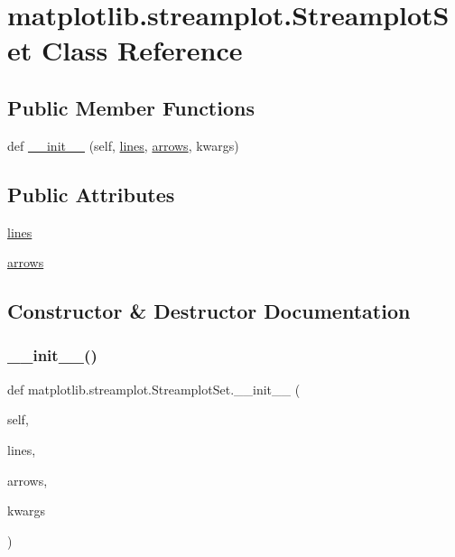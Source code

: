 \hypertarget{classmatplotlib_1_1streamplot_1_1StreamplotSet}{}\section{matplotlib.\+streamplot.\+Streamplot\+Set Class Reference}
\label{classmatplotlib_1_1streamplot_1_1StreamplotSet}
\subsection*{Public Member Functions}
\begin{DoxyCompactItemize}
\item 
def \hyperlink{classmatplotlib_1_1streamplot_1_1StreamplotSet_a49468bf62ed7cc5ff95fdd45304f1c7e}{\+\_\+\+\_\+init\+\_\+\+\_\+} (self, \hyperlink{classmatplotlib_1_1streamplot_1_1StreamplotSet_aea1f1f9048ea660a075d943b421a99ff}{lines}, \hyperlink{classmatplotlib_1_1streamplot_1_1StreamplotSet_ae73feeb622f2d8277081666b247bdd26}{arrows}, kwargs)
\end{DoxyCompactItemize}
\subsection*{Public Attributes}
\begin{DoxyCompactItemize}
\item 
\hyperlink{classmatplotlib_1_1streamplot_1_1StreamplotSet_aea1f1f9048ea660a075d943b421a99ff}{lines}
\item 
\hyperlink{classmatplotlib_1_1streamplot_1_1StreamplotSet_ae73feeb622f2d8277081666b247bdd26}{arrows}
\end{DoxyCompactItemize}


\subsection{Constructor \& Destructor Documentation}
\mbox{\label{classmatplotlib_1_1streamplot_1_1StreamplotSet_a49468bf62ed7cc5ff95fdd45304f1c7e}} 
\subsubsection{\texorpdfstring{\+\_\+\+\_\+init\+\_\+\+\_\+()}{\_\_init\_\_()}}
{\footnotesize\ttfamily def matplotlib.\+streamplot.\+Streamplot\+Set.\+\_\+\+\_\+init\+\_\+\+\_\+ (\begin{DoxyParamCaption}\item[{}]{self,  }\item[{}]{lines,  }\item[{}]{arrows,  }\item[{}]{kwargs }\end{DoxyParamCaption})}



